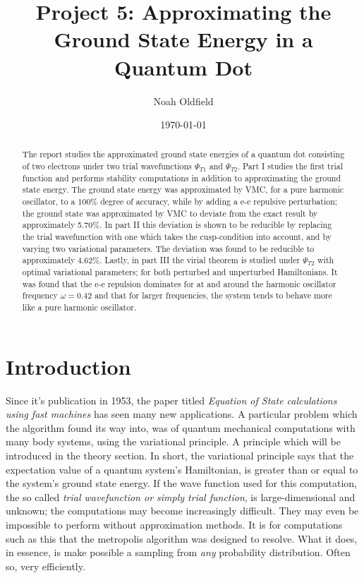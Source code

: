 \documentclass[aip,nobalancelastpage,
twocolumn,
rsi,%
 amsmath,amssymb,
 reprint,%
]{revtex4}
\begin{document}

\title{Project 5: Approximating the Ground State Energy in a Quantum Dot}

\author{Noah Oldfield}

%

\date{\today}%

\begin{abstract}
The report studies the approximated ground state energies of a quantum dot consisting of two electrons under two trial wavefunctions $\Psi_{T1}$ and $\Psi_{T2}$. Part I studies the first trial function and performs stability computations in addition to approximating the ground state energy. The ground state energy was approximated by VMC, for a pure harmonic oscillator, to a $100\%$ degree of accuracy, while by adding a e-e repulsive perturbation; the ground state was approximated by VMC to deviate from the exact result by approximately 5.70\%. In part II this deviation is shown to be reducible by replacing the trial wavefunction with one which takes the cusp-condition into account, and by varying two variational parameters. The deviation
was found to be reducible to approximately 4.62\%. Lastly, in part III the virial theorem is studied under $\Psi_{T2}$ with optimal variational parameters; for both perturbed and unperturbed Hamiltonians. It was found that the e-e repulsion dominates for at and around the harmonic oscillator frequency $\omega= 0.42$ and that for larger frequencies, the system tends to behave more like a pure harmonic oscillator.
\end{abstract}
\maketitle


\section{Introduction}
Since it's publication in 1953, the paper titled \textit{Equation of State calculations using fast machines } has seen many new applications. A particular problem which the algorithm found its way into, was of quantum mechanical computations with many body systems, using the variational principle. A principle which will be introduced in the theory section. In short, the variational principle says that the expectation value of a quantum system's Hamiltonian, is greater than or equal to the system's ground state energy. If the wave function used for this computation, the so called \textit{trial wavefunction or simply trial function}, is large-dimensional and unknown; the computations may become increasingly difficult. They may even be impossible to perform without approximation methods. It is for computations such as this that the metropolis algorithm was designed to resolve. What it does, in essence, is make possible a sampling from \textit{any} probability distribution. Often so, very efficiently. \par
\end{document}
